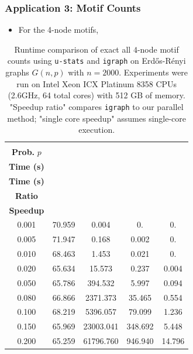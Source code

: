 \documentclass[9pt]{beamer}
\theoremstyle{mystyle}
\theoremstyle{mystyletwo}
\begin{document}
\begin{frame}
    \frametitle{Application 3: Motif Counts}

    \begin{itemize}
        \item For the 4-node motifs,
    \end{itemize}
    \begin{table}
        \centering
        \caption{
            Runtime comparison of exact all $4$-node motif counts using \texttt{u-stats} and \texttt{igraph} on Erdős-Rényi graphs $G(n, p)$ with $n = 2000$.
            Experiments were run on Intel Xeon ICX Platinum 8358 CPUs (2.6GHz, 64 total cores) with 512 GB of memory.
            "Speedup ratio" compares \texttt{igraph} to our parallel method; "single core speedup" assumes single-core execution.
        }
        \label{tab:motif_counts_4}
        \begin{tabular}{ccccc}
            \toprule
            \makecell{\textbf{Edge}                       \\ \textbf{Prob.} $p$} & \makecell{\textbf{\texttt{u-stats}} \\ \textbf{Time (s)}} & \makecell{\textbf{\texttt{igraph}} \\ \textbf{Time (s)}} &\makecell{\textbf{Speedup} \\ \textbf{Ratio}} &  \makecell{\textbf{Single-Core} \\ \textbf{Speedup}} \\
            \midrule
            0.001 & 70.959 & 0.004     & 0.      & 0.     \\
            0.005 & 71.947 & 0.168     & 0.002   & 0.     \\
            0.010 & 68.463 & 1.453     & 0.021   & 0.     \\
            0.020 & 65.634 & 15.573    & 0.237   & 0.004  \\
            0.050 & 65.786 & 394.532   & 5.997   & 0.094  \\
            0.080 & 66.866 & 2371.373  & 35.465  & 0.554  \\
            0.100 & 68.219 & 5396.057  & 79.099  & 1.236  \\
            0.150 & 65.969 & 23003.041 & 348.692 & 5.448  \\
            0.200 & 65.259 & 61796.760 & 946.940 & 14.796 \\
            \bottomrule
        \end{tabular}
    \end{table}
\end{frame}
\end{document}
